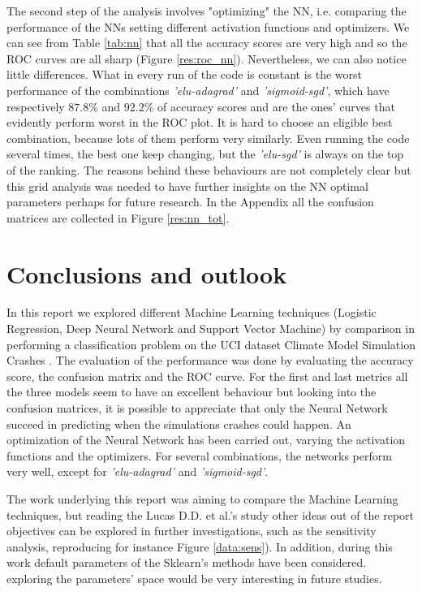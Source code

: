 \documentclass[english,notitlepage,reprint,nofootinbib]{revtex4-1}  %
\begin{document}
The second step of the analysis involves "optimizing" the NN, i.e. comparing the performance of the NNs setting different activation functions and optimizers. We can see from Table \ref{tab:nn} that all the accuracy scores are very high and so the ROC curves are all sharp (Figure \ref{res:roc_nn}). Nevertheless, we can also notice little differences. What in every run of the code is constant is the worst performance of the combinations \textit{'elu-adagrad'} and \textit{'sigmoid-sgd'}, which have respectively $87.8\%$ and $92.2\%$ of accuracy scores and are the ones' curves that evidently perform worst in the ROC plot. It is hard to choose an eligible best combination, because lots of them perform very similarly. Even running the code several times, the best one keep changing, but the \textit{'elu-sgd'} is always on the top of the ranking. The reasons behind these behaviours are not completely clear but this grid analysis was needed to have further insights on the NN optimal parameters perhaps for future research. In the Appendix all the confusion matrices are collected in Figure \ref{res:nn_tot}.

\section{Conclusions and outlook}\label{sec:conclusion}

In this report we explored different Machine Learning techniques (Logistic Regression, Deep Neural Network and Support Vector Machine) by comparison in performing a classification problem on the UCI dataset Climate Model Simulation Crashes \cite{UCI}. The evaluation of the performance was done by evaluating the accuracy score, the confusion matrix and the ROC curve. For the first and last metrics all the three models seem to have an excellent behaviour but looking into the confusion matrices, it is possible to appreciate that only the Neural Network succeed in predicting when the simulations crashes could happen. An optimization of the Neural Network has been carried out, varying the activation functions and the optimizers. For several combinations, the networks perform very well, except for \textit{'elu-adagrad'} and \textit{'sigmoid-sgd'}.

The work underlying this report was aiming to compare the Machine Learning techniques, but reading the Lucas D.D. et al.'s study \cite{failure} other ideas out of the report objectives can be explored in further investigations, such as the sensitivity analysis, reproducing for instance Figure \ref{data:sens}). In addition, during this work default parameters of the Sklearn's methods have been considered. exploring the parameters' space would be very interesting in future studies.
\end{document}
